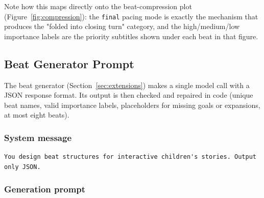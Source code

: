 Note how this maps directly onto the beat-compression plot (Figure~\ref{fig:compression}): the
\texttt{final} pacing mode is exactly the mechanism that produces the
"folded into closing turn" category, and the high/medium/low importance
labels are the priority subtitles shown under each beat in that figure.

\subsection{Beat Generator Prompt}
\label{app:beat-generator}

The beat generator (Section~\ref{sec:extensions}) makes a single model call
with a JSON response format. Its output is then checked and repaired in code
(unique beat names, valid importance labels, placeholders for missing goals
or expansions, at most eight beats).

\subsubsection{System message}

\begin{lstlisting}
You design beat structures for interactive children's stories. Output only JSON.
\end{lstlisting}

\subsubsection{Generation prompt}

